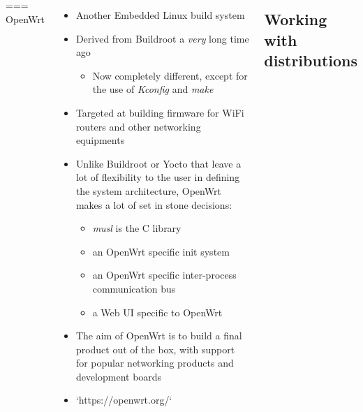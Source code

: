 \begin{columns}
=== {OpenWrt}
  \begin{itemize}
  \item Another Embedded Linux build system
  \item Derived from Buildroot a {\em very} long time ago
    \begin{itemize}
    \item Now completely different, except for the use of {\em Kconfig} and {\em make}
    \end{itemize}
  \item Targeted at building firmware for WiFi routers and other
    networking equipments
  \item Unlike Buildroot or Yocto that leave a lot of flexibility to
    the user in defining the system architecture, OpenWrt makes a lot
    of set in stone decisions:
    \begin{itemize}
    \item {\em musl} is the C library
    \item an OpenWrt specific init system
    \item an OpenWrt specific inter-process communication bus
    \item a Web UI specific to OpenWrt
    \end{itemize}
  \item The aim of OpenWrt is to build a final product out of the box,
    with support for popular networking products and development
    boards
  \item `https://openwrt.org/`
  \end{itemize}


\subsection{Working with distributions}


\end{columns}
